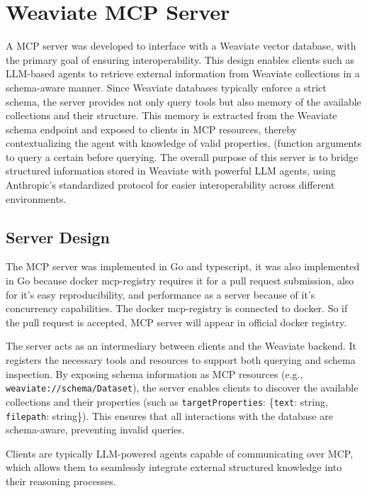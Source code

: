 \section{Weaviate MCP Server}

A \ac{MCP} server was developed to interface with a Weaviate vector database, with the primary goal of ensuring interoperability. This design enables clients such as \ac{LLM}-based agents to retrieve external information from Weaviate collections in a schema-aware manner. Since Weaviate databases typically enforce a strict schema, the server provides not only query tools but also memory of the available collections and their structure. This memory is extracted from the Weaviate schema endpoint and exposed to clients in
MCP resources, thereby contextualizing the agent with knowledge of valid properties, (function arguments to query a certain  before querying.  
The overall purpose of this server is to bridge structured information stored in Weaviate with powerful \ac{LLM} agents, using Anthropic’s standardized protocol for easier interoperability across different environments.

\subsection{Server Design}

The MCP server was implemented in Go and typescript, it was also implemented in Go because docker mcp-registry requires it for a pull request submission, also for it's easy reproducibility, and performance as a server because of it's concurrency capabilities. The docker mcp-registry is connected to docker. So if the pull request is accepted, MCP server will appear in official docker registry.

The server acts as an intermediary between clients and the Weaviate backend. It registers the necessary tools and resources to support both querying and schema inspection. By exposing schema information as MCP resources (e.g., \texttt{weaviate://schema/Dataset}), the server enables clients to discover the available collections and their properties (such as \texttt{targetProperties}: \{\texttt{text}: string, \texttt{filepath}: string\}). This ensures that all interactions with the database are schema-aware, preventing invalid queries.  

Clients are typically \ac{LLM}-powered agents capable of communicating over \ac{MCP}, which allows them to seamlessly integrate external structured knowledge into their reasoning processes.

